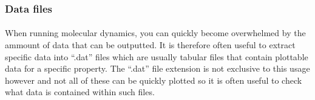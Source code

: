     \subsubsection{Data files}
    \paragraph{}
        When running molecular dynamics, you can quickly become overwhelmed by the ammount of data that can be outputted. It is therefore often useful to extract specific data into \enquote{.dat} files which are usually tabular files that contain plottable data for a specific property. The \enquote{.dat} file extension is not exclusive to this usage however and not all of these can be quickly plotted so it is often useful to check what data is contained within such files. 